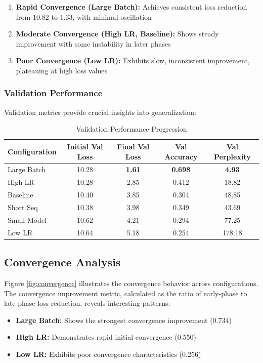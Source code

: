 \documentclass[11pt,a4paper]{article}
\begin{document}
\begin{enumerate}
    \item \textbf{Rapid Convergence (Large Batch):} Achieves consistent loss reduction from 10.82 to 1.33, with minimal oscillation
    \item \textbf{Moderate Convergence (High LR, Baseline):} Shows steady improvement with some instability in later phases
    \item \textbf{Poor Convergence (Low LR):} Exhibits slow, inconsistent improvement, plateauing at high loss values
\end{enumerate}

\subsubsection{Validation Performance}
Validation metrics provide crucial insights into generalization:

\begin{table}[H]
\centering
\caption{Validation Performance Progression}
\label{tab:validation}
\begin{tabular}{@{}lcccc@{}}
\toprule
Configuration & Initial Val Loss & Final Val Loss & Val Accuracy & Val Perplexity \\
\midrule
Large Batch & 10.28 & \textbf{1.61} & \textbf{0.698} & \textbf{4.93} \\
High LR & 10.28 & 2.85 & 0.412 & 18.82 \\
Baseline & 10.40 & 3.85 & 0.304 & 48.85 \\
Short Seq & 10.38 & 3.98 & 0.349 & 43.69 \\
Small Model & 10.62 & 4.21 & 0.294 & 77.25 \\
Low LR & 10.64 & 5.18 & 0.254 & 178.18 \\
\bottomrule
\end{tabular}
\end{table}

\subsection{Convergence Analysis}
Figure \ref{fig:convergence} illustrates the convergence behavior across configurations. The convergence improvement metric, calculated as the ratio of early-phase to late-phase loss reduction, reveals interesting patterns:

\begin{itemize}
    \item \textbf{Large Batch:} Shows the strongest convergence improvement (0.734)
    \item \textbf{High LR:} Demonstrates rapid initial convergence (0.550)
    \item \textbf{Low LR:} Exhibits poor convergence characteristics (0.256)
\end{itemize}
\end{document}
